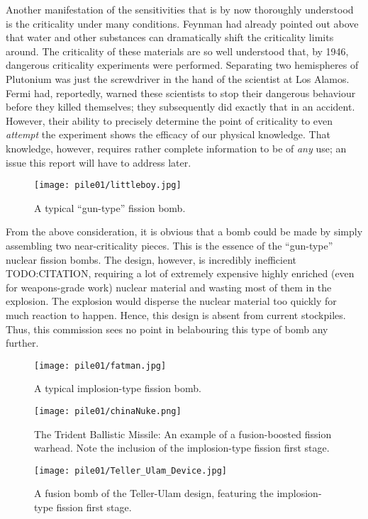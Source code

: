 \documentclass[twoside,titlepage,11pt,twocolumn,a4paper]{article}
\begin{document}
Another manifestation of the sensitivities that is by now thoroughly
understood is the criticality under many conditions. Feynman had
already pointed out above that water and other substances can
dramatically shift the criticality limits
around. \citep{FeynmanJoking} The criticality of these materials are
so well understood that, by 1946, dangerous criticality experiments
were performed. Separating two hemispheres of Plutonium was just the
screwdriver in the hand of the scientist at Los
Alamos. \citep{criticalityAccidents1967} Fermi had, reportedly, warned
these scientists to stop their dangerous behaviour before they killed
themselves; they subsequently did exactly that in an
accident. However, their ability to precisely determine the point of
criticality to even \emph{attempt} the experiment shows the efficacy
of our physical knowledge. That knowledge, however, requires rather
complete information to be of \emph{any} use; an issue this report
will have to address later.

\begin{figure}
  \texttt{[image: pile01/littleboy.jpg]}
  \caption{A typical ``gun-type'' fission
    bomb. \citep{littleBoyAtomicArchive}}
\end{figure}

From the above consideration, it is obvious that a bomb could be made
by simply assembling two near-criticality pieces. This is the essence
of the ``gun-type'' nuclear fission bombs. The design, however, is
incredibly inefficient TODO:CITATION, requiring a lot of extremely
expensive highly enriched (even for weapons-grade work) nuclear
material and wasting most of them in the explosion. The explosion
would disperse the nuclear material too quickly for much reaction to
happen. Hence, this design is absent from current stockpiles. Thus,
this commission sees no point in belabouring this type of bomb any
further.

\begin{figure}
  \texttt{[image: pile01/fatman.jpg]}
  \caption{A typical implosion-type fission
    bomb. \citep{fatManAtomicArchive}}
\end{figure}
\begin{figure}
  \centering
  \texttt{[image: pile01/chinaNuke.png]}
  \caption{The Trident Ballistic Missile: An example of a
    fusion-boosted fission warhead. Note the inclusion of the
    implosion-type fission first
    stage. \citep{TridentBallisticMissile1999NYTimes}}
\end{figure}
\begin{figure}
  \texttt{[image: pile01/Teller\_Ulam\_Device.jpg]}
  \caption{A fusion bomb of the Teller-Ulam design, featuring the
    implosion-type fission first
    stage. \citep{tellerUlamAtomicArchive}}
\end{figure}
\end{document}
